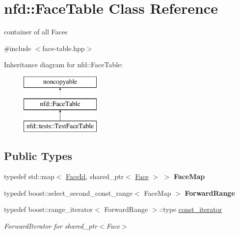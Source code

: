 \hypertarget{classnfd_1_1FaceTable}{}\section{nfd\+:\+:Face\+Table Class Reference}
\label{classnfd_1_1FaceTable}


container of all Faces  




{\ttfamily \#include $<$face-\/table.\+hpp$>$}

Inheritance diagram for nfd\+:\+:Face\+Table\+:\begin{figure}[H]
\begin{center}
\leavevmode
\includegraphics[height=3.000000cm]{classnfd_1_1FaceTable}
\end{center}
\end{figure}
\subsection*{Public Types}
\begin{DoxyCompactItemize}
\item 
typedef std\+::map$<$ \hyperlink{classFaceId}{Face\+Id}, shared\+\_\+ptr$<$ \hyperlink{classnfd_1_1Face}{Face} $>$ $>$ {\bfseries Face\+Map}\hypertarget{classnfd_1_1FaceTable_a1f40d9e47aaddcc3cc629defeef386c5}{}\label{classnfd_1_1FaceTable_a1f40d9e47aaddcc3cc629defeef386c5}

\item 
typedef boost\+::select\+\_\+second\+\_\+const\+\_\+range$<$ Face\+Map $>$ {\bfseries Forward\+Range}\hypertarget{classnfd_1_1FaceTable_a45f5962c58ddbd44cda40bca77a0bc40}{}\label{classnfd_1_1FaceTable_a45f5962c58ddbd44cda40bca77a0bc40}

\item 
typedef boost\+::range\+\_\+iterator$<$ Forward\+Range $>$\+::type \hyperlink{classnfd_1_1FaceTable_ac46211392a2e8640782e802e414ca52d}{const\+\_\+iterator}\hypertarget{classnfd_1_1FaceTable_ac46211392a2e8640782e802e414ca52d}{}\label{classnfd_1_1FaceTable_ac46211392a2e8640782e802e414ca52d}

\begin{DoxyCompactList}\small\item\em Forward\+Iterator for shared\+\_\+ptr$<$\+Face$>$ \end{DoxyCompactList}\end{DoxyCompactItemize}
